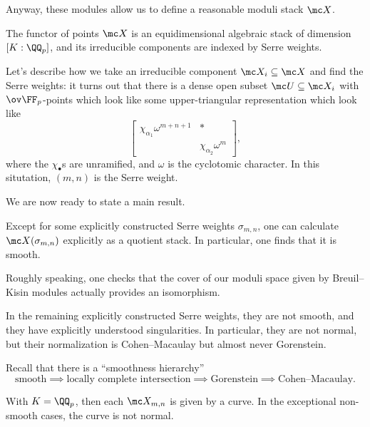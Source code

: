 \documentclass{article}
\begin{document}
Anyway, these modules allow us to define a reasonable moduli stack $\mc X$.
\begin{theorem}
	The functor of points $\mc X$ is an equidimensional algebraic stack of dimension $[K:\QQ_p]$, and its irreducible components are indexed by Serre weights.
\end{theorem}
Let's describe how we take an irreducible component $\mc X_i\subseteq\mc X$ and find the Serre weights: it turns out that there is a dense open subset $\mc U\subseteq\mc X_i$ with $\ov\FF_p$-points which look like some upper-triangular representation which look like
\[\begin{bmatrix}
	\chi_{\alpha_1}\omega^{m+n+1} & * \\ & \chi_{\alpha_2}\omega^m
\end{bmatrix},\]
where the $\chi_\bullet$s are unramified, and $\omega$ is the cyclotomic character. In this situtation, $(m,n)$ is the Serre weight.

We are now ready to state a main result.
\begin{theorem}
	Except for some explicitly constructed Serre weights $\sigma_{m,n}$, one can calculate $\mc X(\sigma_{m,n})$ explicitly as a quotient stack. In particular, one finds that it is smooth.
\end{theorem}
Roughly speaking, one checks that the cover of our moduli space given by Breuil--Kisin modules actually provides an isomorphism.
\begin{theorem}
	In the remaining explicitly constructed Serre weights, they are not smooth, and they have explicitly understood singularities. In particular, they are not normal, but their normalization is Cohen--Macaulay but almost never Gorenstein.
\end{theorem}
\begin{remark}
	Recall that there is a ``smoothness hierarchy''
	\[\text{smooth}\implies\text{locally complete intersection}\implies\text{Gorenstein}\implies\text{Cohen--Macaulay}.\]
\end{remark}
\begin{example}
	With $K=\QQ_p$, then each $\mc X_{m,n}$ is given by a curve. In the exceptional non-smooth cases, the curve is not normal.
\end{example}
\end{document}
